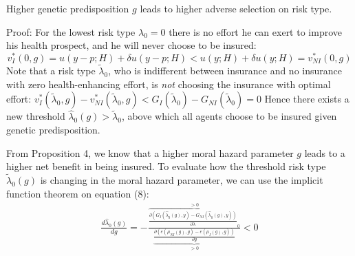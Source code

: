 %

\begin{proposition}
	Higher genetic predisposition $g$ leads to higher adverse selection on risk type.
\end{proposition}


Proof: For the lowest risk type $\lambda_0=0$ there is no effort he can exert to improve his health prospect, and he will never choose to be insured:
\[v_I^*(0,g)=u(y-p;H)+\delta u(y-p;H)<u(y;H)+\delta u(y;H)=v_{NI}^*(0,g)
\]
Note that a risk type $\tilde{\lambda}_0$, who is indifferent between insurance and no insurance with zero health-enhancing effort, is \textit{not} choosing the insurance with optimal effort:  $v_I^*(\tilde{\lambda}_0,g)-v_{NI}^*(\tilde{\lambda}_0,g)<G_I(\tilde{\lambda}_0)-G_{NI}(\tilde{\lambda}_0)=0$ %
Hence there exists a new threshold $\hat{\lambda}_0(g)>\tilde{\lambda}_0$, above which all agents choose to be insured given genetic predisposition.

From Proposition 4, we know that a higher moral hazard parameter $g$ leads to a higher net benefit in being insured.
To evaluate how the threshold risk type $\tilde{\lambda}_0(g)$ is changing in the moral hazard parameter, we can use the implicit function theorem on equation (8):
\begin{align*}
	\frac{d\hat{\lambda}_0(g)}{dg}=-\frac{\overbrace{\frac{\partial(G_I(\hat{\lambda}_0(g),y)-G_{NI}(\hat{\lambda}_0(g),y))}{\partial \lambda}_0}^{>0}}{\underbrace{\frac{\partial (e(\mu_{NI}(g),g)-e(\mu_I(g),g))}{\partial g}}_{>0}}<0
\end{align*}


